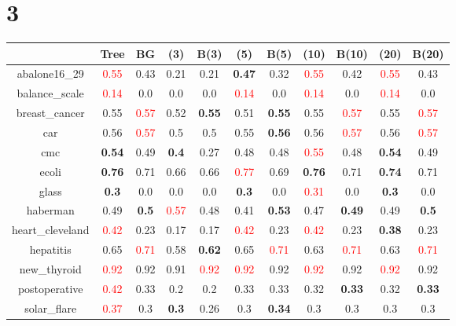 \documentclass{article}%
\begin{document}
\section*{3}%
\begin{tabular}{c|cccccccccc}%
\hline%
&Tree&BG&(3)&B(3)&(5)&B(5)&(10)&B(10)&(20)&B(20)\\%
\hline%
abalone16\_29&\textcolor{red}{ 
0.55
}&0.43&0.21&0.21&\textbf{0.47}&0.32&\textcolor{red}{ 
0.55
}&0.42&\textcolor{red}{ 
0.55
}&0.43\\%
\hline%
balance\_scale&\textcolor{red}{ 
0.14
}&0.0&0.0&0.0&\textcolor{red}{ 
0.14
}&0.0&\textcolor{red}{ 
0.14
}&0.0&\textcolor{red}{ 
0.14
}&0.0\\%
\hline%
breast\_cancer&0.55&\textcolor{red}{ 
0.57
}&0.52&\textbf{0.55}&0.51&\textbf{0.55}&0.55&\textcolor{red}{ 
0.57
}&0.55&\textcolor{red}{ 
0.57
}\\%
\hline%
car&0.56&\textcolor{red}{ 
0.57
}&0.5&0.5&0.55&\textbf{0.56}&0.56&\textcolor{red}{ 
0.57
}&0.56&\textcolor{red}{ 
0.57
}\\%
\hline%
cmc&\textbf{0.54}&0.49&\textbf{0.4}&0.27&0.48&0.48&\textcolor{red}{ 
0.55
}&0.48&\textbf{0.54}&0.49\\%
\hline%
ecoli&\textbf{0.76}&0.71&0.66&0.66&\textcolor{red}{ 
0.77
}&0.69&\textbf{0.76}&0.71&\textbf{0.74}&0.71\\%
\hline%
glass&\textbf{0.3}&0.0&0.0&0.0&\textbf{0.3}&0.0&\textcolor{red}{ 
0.31
}&0.0&\textbf{0.3}&0.0\\%
\hline%
haberman&0.49&\textbf{0.5}&\textcolor{red}{ 
0.57
}&0.48&0.41&\textbf{0.53}&0.47&\textbf{0.49}&0.49&\textbf{0.5}\\%
\hline%
heart\_cleveland&\textcolor{red}{ 
0.42
}&0.23&0.17&0.17&\textcolor{red}{ 
0.42
}&0.23&\textcolor{red}{ 
0.42
}&0.23&\textbf{0.38}&0.23\\%
\hline%
hepatitis&0.65&\textcolor{red}{ 
0.71
}&0.58&\textbf{0.62}&0.65&\textcolor{red}{ 
0.71
}&0.63&\textcolor{red}{ 
0.71
}&0.63&\textcolor{red}{ 
0.71
}\\%
\hline%
new\_thyroid&\textcolor{red}{ 
0.92
}&0.92&0.91&\textcolor{red}{ 
0.92
}&\textcolor{red}{ 
0.92
}&0.92&\textcolor{red}{ 
0.92
}&0.92&\textcolor{red}{ 
0.92
}&0.92\\%
\hline%
postoperative&\textcolor{red}{ 
0.42
}&0.33&0.2&0.2&0.33&0.33&0.32&\textbf{0.33}&0.32&\textbf{0.33}\\%
\hline%
solar\_flare&\textcolor{red}{ 
0.37
}&0.3&\textbf{0.3}&0.26&0.3&\textbf{0.34}&0.3&0.3&0.3&0.3\\%
\hline%

\end{tabular}
\end{document}

